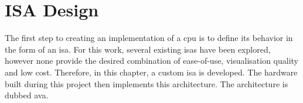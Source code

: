 \clearpage
\section{ISA Design} \label{sec:design_isa}

The first step to creating an implementation of a \ac{cpu} is to define its behavior in the form of an \ac{isa}. For this work, several existing \acp{isa} have been explored, however none provide the desired combination of ease-of-use, visualisation quality and low cost. Therefore, in this chapter, a custom \ac{isa} is developed. The hardware built during this project then implements this architecture. The architecture is dubbed \ac{ava}. 





